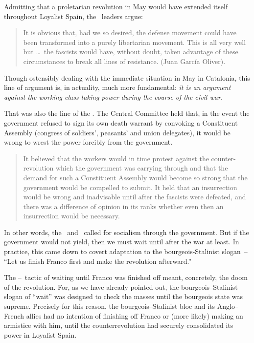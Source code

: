 Admitting that a proletarian revolution in May would have extended itself throughout Loyalist Spain, the \CNT\ leaders argue:

\begin{quotation}
  It is obvious that, had we so desired, the defense movement could have been transformed into a purely libertarian movement. This is all very well but \dots\ the fascists would have, without doubt, taken advantage of these circumstances to break all lines of resistance. (Juan Garc\'ia Oliver).
\end{quotation}

Though ostensibly dealing with the immediate situation in May in Catalonia, this line of argument is, in actuality, much more fundamental: \emph{it is an argument against the working class taking power during the course of the civil war.}

That was also the line of the \POUM\kn. The Central Committee held that, in the event the government refused to sign its own death warrant by convoking a Constituent Assembly (congress of soldiers’\kn\kn, peasants’ and union delegates), it would be wrong to wrest the power forcibly from the government.

\begin{quotation}
  It believed that the workers would in time protest against the counter-revolution which the government was carrying through and that the demand for such a Constituent Assembly would become so strong that the government would be compelled to submit. It held that an insurrection would be wrong and inadvisable until after the fascists were defeated, and there was a difference of opinion in its ranks whether even then an insurrection would be necessary.
\end{quotation}

In other words, the \CNT\ and \POUM\ called for socialism through the government. But if the government would not yield, then we must wait until after the war at least. In practice, this came down to covert adaptation to the bourgeois-Stalinist slogan~-- ``Let us finish Franco first and make the revolution afterward.''

The \POUM--\CNT\ tactic of waiting until Franco was finished off meant, concretely, the doom of the revolution. For, as we have already pointed out, the bourgeois--Stalinist slogan of ``wait'' was designed to check the masses until the bourgeois state was supreme. Precisely for this reason, the bourgeois--Stalinist bloc and its Anglo--French allies had no intention of finishing off Franco or (more likely) making an armistice with him, until the counterrevolution had securely consolidated its power in Loyalist Spain.

